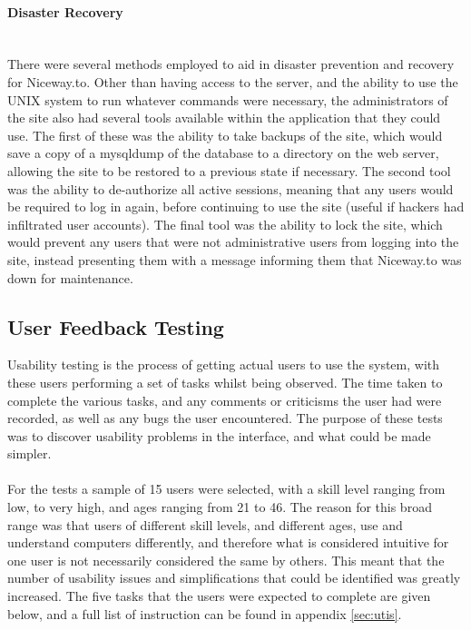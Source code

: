\paragraph{Disaster Recovery}\ \\
There were several methods employed to aid in disaster prevention and recovery for Niceway.to. Other than having access to the server, and the ability to use the UNIX system to run whatever commands were necessary, the administrators of the site also had several tools available within the application that they could use. The first of these was the ability to take backups of the site, which would save a copy of a mysqldump of the database to a directory on the web server, allowing the site to be restored to a previous state if necessary. The second tool was the ability to de-authorize all active sessions, meaning that any users would be required to log in again, before continuing to use the site (useful if hackers had infiltrated user accounts). The final tool was the ability to lock the site, which would prevent any users that were not administrative users from logging into the site, instead presenting them with a message informing them that Niceway.to was down for maintenance.

\newpage 
\subsection{User Feedback Testing}
\label{sec:rite}
Usability testing is the process of getting actual users to use the system, with these users performing a set of tasks whilst being observed. The time taken to complete the various tasks, and any comments or criticisms the user had were recorded, as well as any bugs the user encountered. The purpose of these tests was to discover usability problems in the interface, and what could be made simpler.\ \\
\ \\
For the tests a sample of 15 users were selected, with a skill level ranging from low, to very high, and ages ranging from 21 to 46. The reason for this broad range was that users of different skill levels, and different ages, use and understand computers differently, and therefore what is considered intuitive for one user is not necessarily considered the same by others. This meant that the number of usability issues and simplifications that could be identified was greatly increased. The five tasks that the users were expected to complete are given below, and a full list of instruction can be found in appendix \ref{sec:utis}.

